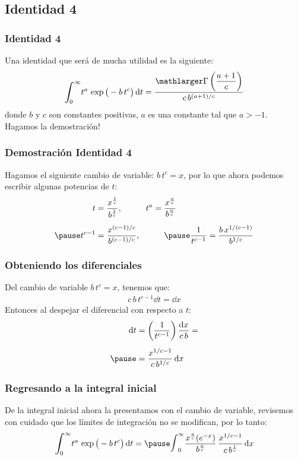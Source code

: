 \documentclass[12pt]{beamer}
\begin{document}
\subsection{Identidad 4}

\begin{frame}
\frametitle{Identidad 4}
Una identidad que será de mucha utilidad es la siguiente:
\begin{align*}
\scaleint{6ex}_{\bs 0}^{\infty} t^{a} \, \exp \big( -b \, t^{c} \big) \dd{t} = \dfrac{\mathlarger\Gamma \left( \dfrac{a + 1}{c} \right) }{c \, b^{(a+1)/c}}
\end{align*}
donde $b$ y $c$ son constantes positivas, $a$ es una constante tal que $a > -1$.
\\
\bigskip
\pause
Hagamos la demostración!
\end{frame}
\begin{frame}
\frametitle{Demostración Identidad 4}
Hagamos el siguiente cambio de variable: $b \, t^{c} = x$, por lo que ahora podemos escribir algunas potencias de $t$:
\pause
\begin{eqnarray*}
\begin{aligned}
t &= \dfrac{x^{\frac{1}{c}}}{b^{\frac{1}{c}}}, \hspace{1cm} t^{a} = \dfrac{x^{\frac{a}{c}}}{b^{\frac{a}{c}}} \\[0.5em] \pause
t^{c-1} &= \dfrac{x^{(c-1)/c}}{b^{(c-1)/c}}, \hspace{1cm} \pause \dfrac{1}{t^{c-1}} = \dfrac{b \, x^{1/(c-1)}}{b^{1/c}}
\end{aligned}
\end{eqnarray*}
\end{frame}
\begin{frame}
\frametitle{Obteniendo los diferenciales}
Del cambio de variable $b \, t^{c} = x$, tenemos que:
\pause
\begin{align*}
c \, b \, t^{c-1} \dd{t} = \dd{x}
\end{align*}
\pause
Entonces al despejar el diferencial con respecto a $t$:
\pause
\begin{eqnarray*}
\begin{aligned}
\dd{t} &= \left( \dfrac{1}{t^{c-1}} \right) \dfrac{\dd{x}}{c \, b} = \\[0.5em] \pause
&= \dfrac{x^{1/c-1}}{c \, b^{1/c}} \dd{x}
\end{aligned}
\end{eqnarray*}
\end{frame}
\begin{frame}
\frametitle{Regresando a la integral inicial}
De la integral inicial ahora la presentamos con el cambio de variable, revisemos con cuidado que los límites de integración no se modifican, por lo tanto:
\pause
\begin{eqnarray*}
\scaleint{6ex}_{\bs 0}^{\infty} t^{a} \, \exp \big( -b \, t^{c} \big) \dd{t} = \pause  \displaystyle \scalerel{\scaleint{6ex}_{\text{\small{0}}}^{\text{\small{$\infty$}}}}{\dfrac{x^{\frac{a}{c}} (e^{-x})}{b^{\frac{a}{c}}}} \, \dfrac{x^{1/c - 1}}{c \, b^{\frac{1}{c}}} \dd{x}
\end{eqnarray*}
\end{frame}
\end{document}

